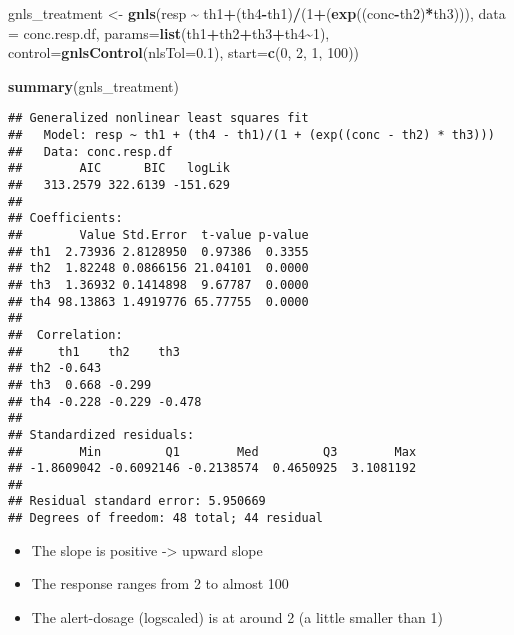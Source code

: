 \documentclass[
]{article}
\newenvironment{Shaded}{\begin{snugshade}}{\end{snugshade}}
\newcommand{\AttributeTok}[1]{\textcolor[rgb]{0.13,0.29,0.53}{#1}}
\newcommand{\DecValTok}[1]{\textcolor[rgb]{0.00,0.00,0.81}{#1}}
\newcommand{\FloatTok}[1]{\textcolor[rgb]{0.00,0.00,0.81}{#1}}
\newcommand{\FunctionTok}[1]{\textcolor[rgb]{0.13,0.29,0.53}{\textbf{#1}}}
\newcommand{\NormalTok}[1]{#1}
\newcommand{\OtherTok}[1]{\textcolor[rgb]{0.56,0.35,0.01}{#1}}
\newcommand{\SpecialCharTok}[1]{\textcolor[rgb]{0.81,0.36,0.00}{\textbf{#1}}}
\providecommand{\tightlist}{%
  \setlength{\itemsep}{0pt}\setlength{\parskip}{0pt}}
\begin{document}
\begin{Shaded}
\begin{Highlighting}[]
\NormalTok{gnls\_treatment }\OtherTok{\textless{}{-}} \FunctionTok{gnls}\NormalTok{(resp }\SpecialCharTok{\textasciitilde{}}\NormalTok{ th1}\SpecialCharTok{+}\NormalTok{(th4}\SpecialCharTok{{-}}\NormalTok{th1)}\SpecialCharTok{/}\NormalTok{(}\DecValTok{1}\SpecialCharTok{+}\NormalTok{(}\FunctionTok{exp}\NormalTok{((conc}\SpecialCharTok{{-}}\NormalTok{th2)}\SpecialCharTok{*}\NormalTok{th3))),}
                       \AttributeTok{data =}\NormalTok{ conc.resp.df,}
                       \AttributeTok{params=}\FunctionTok{list}\NormalTok{(th1}\SpecialCharTok{+}\NormalTok{th2}\SpecialCharTok{+}\NormalTok{th3}\SpecialCharTok{+}\NormalTok{th4}\SpecialCharTok{\textasciitilde{}}\DecValTok{1}\NormalTok{),}
                       \AttributeTok{control=}\FunctionTok{gnlsControl}\NormalTok{(}\AttributeTok{nlsTol=}\FloatTok{0.1}\NormalTok{),}
                       \AttributeTok{start=}\FunctionTok{c}\NormalTok{(}\DecValTok{0}\NormalTok{, }\DecValTok{2}\NormalTok{, }\DecValTok{1}\NormalTok{, }\DecValTok{100}\NormalTok{))}

\FunctionTok{summary}\NormalTok{(gnls\_treatment)}
\end{Highlighting}
\end{Shaded}

\begin{verbatim}
## Generalized nonlinear least squares fit
##   Model: resp ~ th1 + (th4 - th1)/(1 + (exp((conc - th2) * th3))) 
##   Data: conc.resp.df 
##        AIC      BIC   logLik
##   313.2579 322.6139 -151.629
## 
## Coefficients:
##        Value Std.Error  t-value p-value
## th1  2.73936 2.8128950  0.97386  0.3355
## th2  1.82248 0.0866156 21.04101  0.0000
## th3  1.36932 0.1414898  9.67787  0.0000
## th4 98.13863 1.4919776 65.77755  0.0000
## 
##  Correlation: 
##     th1    th2    th3   
## th2 -0.643              
## th3  0.668 -0.299       
## th4 -0.228 -0.229 -0.478
## 
## Standardized residuals:
##        Min         Q1        Med         Q3        Max 
## -1.8609042 -0.6092146 -0.2138574  0.4650925  3.1081192 
## 
## Residual standard error: 5.950669 
## Degrees of freedom: 48 total; 44 residual
\end{verbatim}

\begin{itemize}
\tightlist
\item
  The slope is positive -\textgreater{} upward slope
\item
  The response ranges from 2 to almost 100
\item
  The alert-dosage (logscaled) is at around 2 (a little smaller than 1)
\end{itemize}
\end{document}
